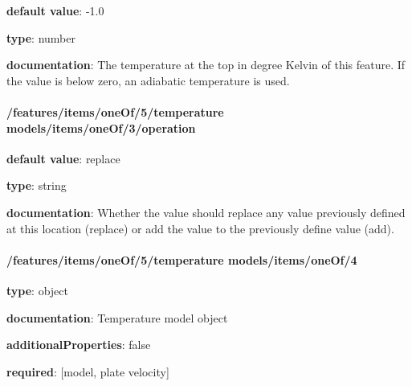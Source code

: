 \begin{itemized}
\item {\bf default value}: -1.0
\item {\bf type}: number
\item {\bf documentation}: The temperature at the top in degree Kelvin of this feature. If the value is below zero, an adiabatic temperature is used.
\end{itemized}\paragraph{/features/items/oneOf/5/temperature models/items/oneOf/3/operation} \begin{itemized}
\item {\bf default value}: replace
\item {\bf type}: string
\item {\bf documentation}: Whether the value should replace any value previously defined at this location (replace) or add the value to the previously define value (add).
\end{itemized}\paragraph{/features/items/oneOf/5/temperature models/items/oneOf/4} \begin{itemized}
\item {\bf type}: object
\item {\bf documentation}: Temperature model object
\item {\bf additionalProperties}: false
\item {\bf required}: [model, plate velocity]\end{itemized}
